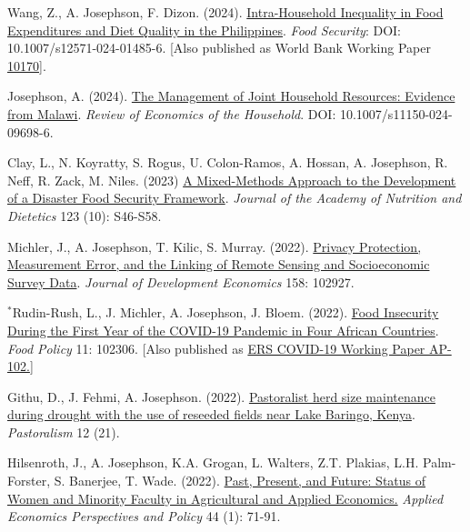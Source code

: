 \documentclass[letterpaper]{article}
\begin{document}
\begin{etaremune}
\item Wang, Z., A. Josephson, F. Dizon. (2024). \href{https://link.springer.com/article/10.1007/s12571-024-01485-6}{Intra-Household Inequality in Food Expenditures and Diet Quality in the Philippines}. \emph{Food Security}: DOI: 10.1007/s12571-024-01485-6. [Also published as World Bank Working Paper \href{https://documents.worldbank.org/en/publication/documents-reports/documentdetail/099311009122242359/idu088daeb7f01ac504f7809da400097f5a00861}{10170}]. 
   	
\item Josephson, A. (2024). \href{https://link.springer.com/article/10.1007/s11150-024-09698-6}{The Management of Joint Household Resources: Evidence from Malawi}. \emph{Review of Economics of the Household}. DOI: 10.1007/s11150-024-09698-6.

\item Clay, L., N. Koyratty, S. Rogus, U. Colon-Ramos, A. Hossan, A. Josephson, R. Neff, R. Zack, M. Niles. (2023) \href{https://www.sciencedirect.com/science/article/pii/S2212267223002368}{A Mixed-Methods Approach to the Development of a Disaster Food Security Framework}. \emph{Journal of the Academy of Nutrition and Dietetics} 123 (10): S46-S58. 
 
\item Michler, J., A. Josephson, T. Kilic, S. Murray. (2022). \href{https://www.sciencedirect.com/science/article/pii/S0304387822000839}{Privacy Protection, Measurement Error, and the Linking of Remote Sensing and Socioeconomic Survey Data}. \emph{Journal of Development Economics} 158: 102927.  
   
\item $^*$Rudin-Rush, L., J. Michler, A. Josephson, J. Bloem. (2022). \href{https://www.sciencedirect.com/science/article/pii/S0306919222000823}{Food Insecurity During the First Year of the COVID-19 Pandemic in Four African Countries}. \emph{Food Policy} 11: 102306. [Also published as \href{https://www.ers.usda.gov/publications/pub-details/?pubid=104199https}{ERS COVID-19 Working Paper AP-102.}]	
 
\item Githu, D., J. Fehmi, A. Josephson. (2022). \href{https://pastoralismjournal.springeropen.com/articles/10.1186/s13570-022-00238-4}{Pastoralist herd size maintenance during drought with the use of reseeded fields near Lake Baringo, Kenya}. \emph{Pastoralism} 12 (21). 	
   	
\item Hilsenroth, J., A. Josephson, K.A. Grogan, L. Walters, Z.T. Plakias, L.H. Palm-Forster, S. Banerjee, T. Wade. (2022). \href{https://onlinelibrary.wiley.com/doi/full/10.1002/aepp.13191}{Past, Present, and Future: Status of Women and Minority Faculty in Agricultural and Applied Economics.} \emph{Applied Economics Perspectives and Policy} 44 (1): 71-91. 


\end{etaremune}
\end{document}
